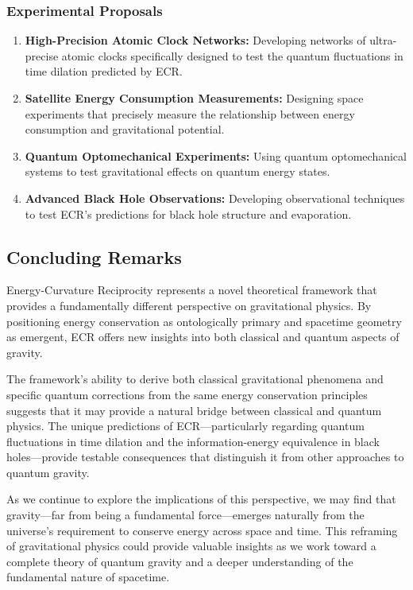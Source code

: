 \documentclass[11pt,a4paper]{article}
\begin{document}
\subsubsection{Experimental Proposals}
\begin{enumerate}
    \item \textbf{High-Precision Atomic Clock Networks:} Developing networks of ultra-precise atomic clocks specifically designed to test the quantum fluctuations in time dilation predicted by ECR.
    
    \item \textbf{Satellite Energy Consumption Measurements:} Designing space experiments that precisely measure the relationship between energy consumption and gravitational potential.
    
    \item \textbf{Quantum Optomechanical Experiments:} Using quantum optomechanical systems to test gravitational effects on quantum energy states.
    
    \item \textbf{Advanced Black Hole Observations:} Developing observational techniques to test ECR's predictions for black hole structure and evaporation.
\end{enumerate}

\subsection{Concluding Remarks}

Energy-Curvature Reciprocity represents a novel theoretical framework that provides a fundamentally different perspective on gravitational physics. By positioning energy conservation as ontologically primary and spacetime geometry as emergent, ECR offers new insights into both classical and quantum aspects of gravity.

The framework's ability to derive both classical gravitational phenomena and specific quantum corrections from the same energy conservation principles suggests that it may provide a natural bridge between classical and quantum physics. The unique predictions of ECR—particularly regarding quantum fluctuations in time dilation and the information-energy equivalence in black holes—provide testable consequences that distinguish it from other approaches to quantum gravity.

As we continue to explore the implications of this perspective, we may find that gravity—far from being a fundamental force—emerges naturally from the universe's requirement to conserve energy across space and time. This reframing of gravitational physics could provide valuable insights as we work toward a complete theory of quantum gravity and a deeper understanding of the fundamental nature of spacetime.
\end{document}
